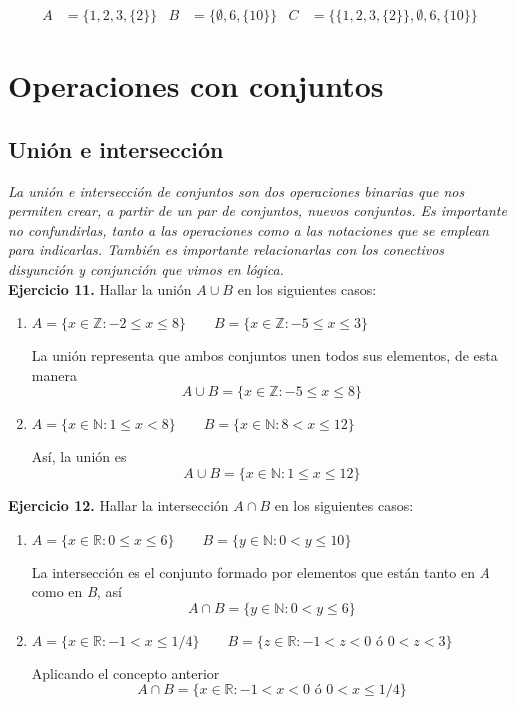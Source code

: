 \begin{align*}
	A &= \{1, 2, 3, \{2\}\} & B &= \{\emptyset, 6, \{10\}\} & C &= \{\{1, 2, 3, \{2\}\}, \emptyset, 6, \{10\} \}
\end{align*}

\section{Operaciones con conjuntos}

\subsection{Uni\'on e intersecci\'on}

\textit{La unión e intersección de conjuntos son dos operaciones binarias que nos permiten crear, a partir de un par 
de conjuntos, nuevos conjuntos. Es importante no confundirlas, tanto a las operaciones como a las notaciones que se
	emplean para indicarlas. También es importante relacionarlas con los conectivos disyunción y conjunción que vimos en
	lógica.}\\

\textbf{Ejercicio 11.} Hallar la uni\'on $A \cup B$ en los siguientes casos:

\begin{enumerate}
	\item $A = \{x \in \mathbb{Z}: -2 \leq x \leq 8\} \qquad B = \{x \in \mathbb{Z}: -5 \leq x \leq 3\}$
	
	La uni\'on representa que ambos conjuntos unen todos sus elementos, de esta manera $$A \cup B = \{x \in \mathbb{Z}: -5 \leq x \leq 8\}$$
	
	\item $A = \{x \in \mathbb{N}: 1 \leq x < 8\} \qquad B = \{x \in \mathbb{N}: 8 < x \leq 12\}$
	
	As\'i, la uni\'on es $$A \cup B = \{x \in \mathbb{N}: 1 \leq x \leq 12\}$$
\end{enumerate}

\textbf{Ejercicio 12.} Hallar la intersecci\'on $A \cap B$ en los siguientes casos:

\begin{enumerate}
	\item $A = \{x \in \mathbb{R}: 0 \leq x \leq 6\} \qquad B = \{y \in \mathbb{N}: 0 < y \leq 10\}$
	
	La intersecci\'on es el conjunto formado por elementos que est\'an tanto en \textit{A} como en \textit{B}, as\'i $$A \cap B = \{y \in \mathbb{N}: 0 < y \leq 6\}$$
	
	\item $A = \{x \in \mathbb{R}: -1 < x \leq 1/4\} \qquad B = \{ z \in \mathbb{R}: -1 < z < 0 \text{ \'o } 0 < z < 3 \}$
	
	Aplicando el concepto anterior $$ A\cap B = \{ x \in \mathbb{R}: -1 < x < 0 \text{ \'o } 0 < x \leq 1/4 \}$$
\end{enumerate}

